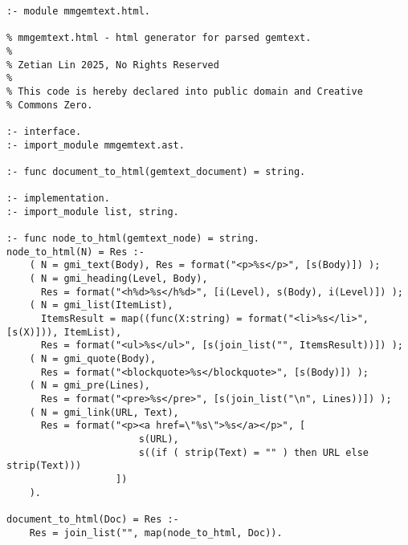 \begin{lstlisting}[language=Mercury]
:- module mmgemtext.html.

% mmgemtext.html - html generator for parsed gemtext.
%
% Zetian Lin 2025, No Rights Reserved
%
% This code is hereby declared into public domain and Creative
% Commons Zero.

:- interface.
:- import_module mmgemtext.ast.

:- func document_to_html(gemtext_document) = string.

:- implementation.
:- import_module list, string.

:- func node_to_html(gemtext_node) = string.
node_to_html(N) = Res :-
	( N = gmi_text(Body), Res = format("<p>%s</p>", [s(Body)]) );
	( N = gmi_heading(Level, Body),
	  Res = format("<h%d>%s</h%d>", [i(Level), s(Body), i(Level)]) );
	( N = gmi_list(ItemList),
	  ItemsResult = map((func(X:string) = format("<li>%s</li>", [s(X)])), ItemList),
	  Res = format("<ul>%s</ul>", [s(join_list("", ItemsResult))]) );
	( N = gmi_quote(Body),
	  Res = format("<blockquote>%s</blockquote>", [s(Body)]) );
	( N = gmi_pre(Lines),
	  Res = format("<pre>%s</pre>", [s(join_list("\n", Lines))]) );
	( N = gmi_link(URL, Text),
	  Res = format("<p><a href=\"%s\">%s</a></p>", [
					   s(URL),
					   s((if ( strip(Text) = "" ) then URL else strip(Text)))
				   ])
	).
											
document_to_html(Doc) = Res :-
    Res = join_list("", map(node_to_html, Doc)).
\end{lstlisting}

